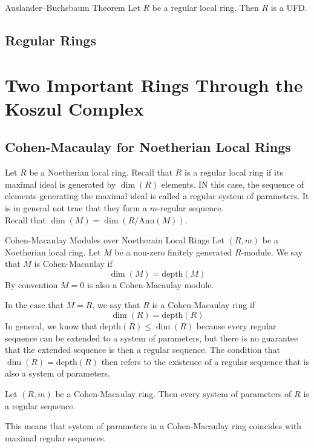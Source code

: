 \documentclass[a4paper]{article}
\begin{document}
\begin{thm}{Auslander–Buchsbaum Theorem}{} Let $R$ be a regular local ring. Then $R$ is a UFD. 
\end{thm}

\subsection{Regular Rings}

\pagebreak
\section{Two Important Rings Through the Koszul Complex}
\subsection{Cohen-Macaulay for Noetherian Local Rings}
Let $R$ be a Noetherian local ring. Recall that $R$ is a regular local ring if its maximal ideal is generated by $\dim(R)$ elements. IN this case, the sequence of elements generating the maximal ideal is called a regular system of parameters. It is in general not true that they form a $m$-regular sequence. \\

Recall that $\dim(M)=\dim(R/\text{Ann}(M))$. 

\begin{defn}{Cohen-Macaulay Modules over Noetherain Local Rings}{} Let $(R,m)$ be a Noetherian local ring. Let $M$ be a non-zero finitely generated $R$-module. We say that $M$ is Cohen-Macaulay if $$\dim(M)=\text{depth}(M)$$ By convention $M=0$ is also a Cohen-Macaulay module. 
\end{defn}

In the case that $M=R$, we say that $R$ is a Cohen-Macaulay ring if $$\dim(R)=\text{depth}(R)$$ In general, we know that $\text{depth}(R)\leq\dim(R)$ because every regular sequence can be extended to a system of parameters, but there is no guarantee that the extended sequence is then a regular sequence. The condition that $\dim(R)=\text{depth}(R)$ then refers to the existence of a regular sequence that is also a system of parameters. 

\begin{prp}{}{} Let $(R,m)$ be a Cohen-Macaulay ring. Then every system of parameters of $R$ is a regular sequence. 
\end{prp}

This means that system of parameters in a Cohen-Macaulay ring coincides with maximal regular sequences. 
\end{document}
